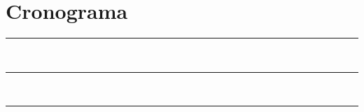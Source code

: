 \documentclass[
    12pt,
    oneside,
    openany,
    a4paper,
    english,
    brazil
]{article}
\begin{document}
\begingroup
\let\clearpage\relax
\section[Cronograma]{Cronograma}

\endgroup


\singlespacing

\begin{flushleft}
    \begingroup
    \let\clearpage\relax
    
    \endgroup
\end{flushleft}

\vspace{3cm}
\begin{flushright}
    \rule{6cm}{1pt} \\
    \autor

    \rule{6cm}{1pt} \\
    \orientador
    
    \rule{6cm}{1pt} \\
    \coorientador
\end{flushright}
\end{document}

